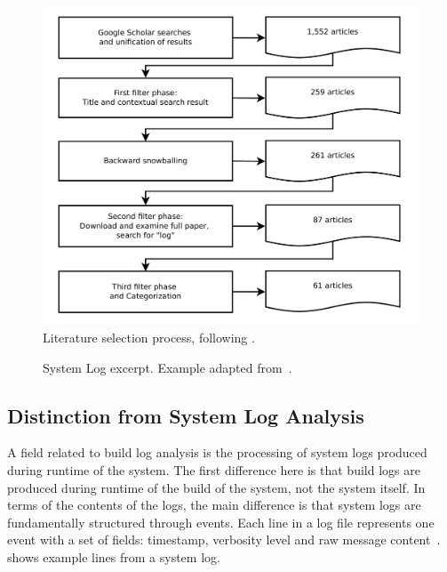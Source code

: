 \begin{figure}[tb]
	\centering
	\includegraphics[width=\columnwidth, clip]{img/lit_survey.pdf}
	\caption{Literature selection process, following
	\cite{petersen2015guidelines}.}
	\label{fig:lit-survey}
\end{figure}


\begin{figure}[b]
  \centering
  
  \caption{System Log excerpt.
Example adapted from~\cite{he2017towards}.}
  \label{lst:system-log}
\end{figure}

\subsection{Distinction from System Log Analysis}
\label{sec:system-log-analysis}
A field related to build log analysis is the processing of system logs produced during runtime of the system.
The first difference here is that build logs are produced during runtime
of the build of the system, not the system itself.
In terms of the contents of the logs, the main difference is that system
logs are fundamentally structured
through events.
Each line in a log file represents one event with a
set of fields: timestamp, verbosity level and raw message
content~\cite{he2017towards}.
 shows
example lines from a system log.



